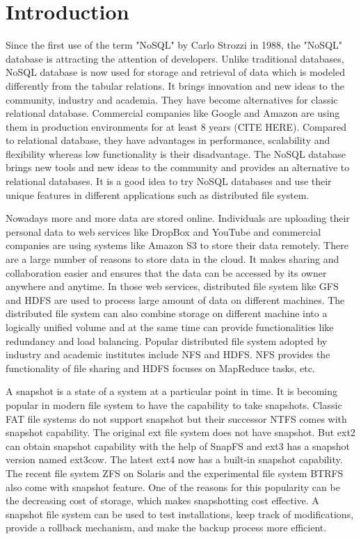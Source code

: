 \chapter{Introduction}
\label{chap:intro}

    Since the first use of the term "NoSQL" by Carlo Strozzi in 1988, the "NoSQL" database is attracting the attention of developers. Unlike traditional databases, NoSQL database is now used for storage and retrieval of data which is modeled differently from the tabular relations. It brings innovation and new ideas to the community, industry and academia. They have become alternatives for classic relational database. Commercial companies like Google and Amazon are using them in production environments for at least 8 years (CITE HERE). Compared to relational database, they have advantages in performance, scalability and flexibility whereas low functionality is their disadvantage. The NoSQL database brings new tools and new ideas to the community and provides an alternative to relational databases. It is a good idea to try NoSQL databases and use their unique features in different applications such as distributed file system.

    Nowadays more and more data are stored online. Individuals are uploading their personal data to web services like DropBox and YouTube and commercial companies are using systems like Amazon S3 to store their data remotely. There are a large number of reasons to store data in the cloud. It makes sharing and collaboration easier and ensures that the data can be accessed by its owner anywhere and anytime. In those web services, distributed file system like GFS and HDFS are used to process large amount of data on different machines. The distributed file system can also combine storage on different machine into a logically unified volume and at the same time can provide functionalities like redundancy and load balancing. Popular distributed file system adopted by industry and academic institutes include NFS and HDFS. NFS provides the functionality of file sharing and HDFS focuses on MapReduce tasks, etc.

    A snapshot is a state of a system at a particular point in time. It is becoming popular in modern file system to have the capability to take snapshots. Classic FAT file systems do not support snapshot but their successor NTFS comes with snapshot capability. The original ext file system does not have snapshot. But ext2 can obtain snapshot capability with the help of SnapFS and ext3 has a snapshot version named ext3cow. The latest ext4 now has a built-in snapshot capability. The recent file system ZFS on Solaris and the experimental file system BTRFS also come with snapshot feature. One of the reasons for this popularity can be the decreasing cost of storage, which makes snapshotting cost effective. A snapshot file system can be used to test installations, keep track of modifications, provide a rollback mechanism, and make the backup process more efficient.

